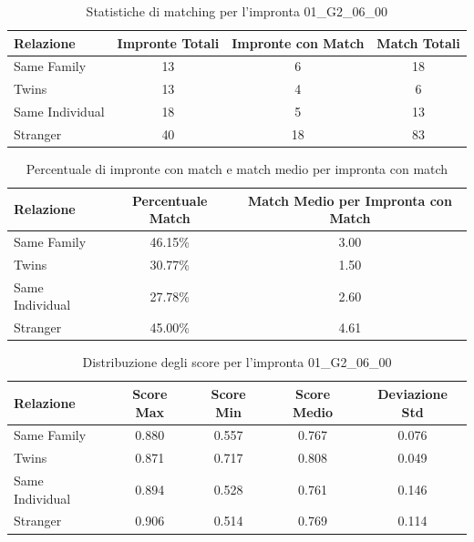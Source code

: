\begin{table}[htbp]
\centering
\caption{Statistiche di matching per l'impronta 01\_G2\_06\_00}
\label{tab:results_01_G2_06_00}
\begin{tabular}{|l|c|c|c|}
\hline
\textbf{Relazione} & \textbf{Impronte Totali} & \textbf{Impronte con Match} & \textbf{Match Totali} \\
\hline
Same Family & 13 & 6 & 18 \\
\hline
Twins & 13 & 4 & 6 \\
\hline
Same Individual & 18 & 5 & 13 \\
\hline
Stranger & 40 & 18 & 83 \\
\hline
\end{tabular}
\end{table}


\begin{table}[htbp]
\centering
\caption{Percentuale di impronte con match e match medio per impronta con match}
\label{tab:match_percentage_01_G2_06_00}
\begin{tabular}{|l|c|c|}
\hline
\textbf{Relazione} & \textbf{Percentuale Match} & \textbf{Match Medio per Impronta con Match} \\
\hline
Same Family & 46.15\% & 3.00 \\
\hline
Twins & 30.77\% & 1.50 \\
\hline
Same Individual & 27.78\% & 2.60 \\
\hline
Stranger & 45.00\% & 4.61 \\
\hline
\end{tabular}
\end{table}


\begin{table}[htbp]
\centering
\caption{Distribuzione degli score per l'impronta 01\_G2\_06\_00}
\label{tab:scores_01_G2_06_00}
\begin{tabular}{|l|c|c|c|c|}
\hline
\textbf{Relazione} & \textbf{Score Max} & \textbf{Score Min} & \textbf{Score Medio} & \textbf{Deviazione Std} \\
\hline
Same Family & 0.880 & 0.557 & 0.767 & 0.076 \\
\hline
Twins & 0.871 & 0.717 & 0.808 & 0.049 \\
\hline
Same Individual & 0.894 & 0.528 & 0.761 & 0.146 \\
\hline
Stranger & 0.906 & 0.514 & 0.769 & 0.114 \\
\hline
\end{tabular}
\end{table}

